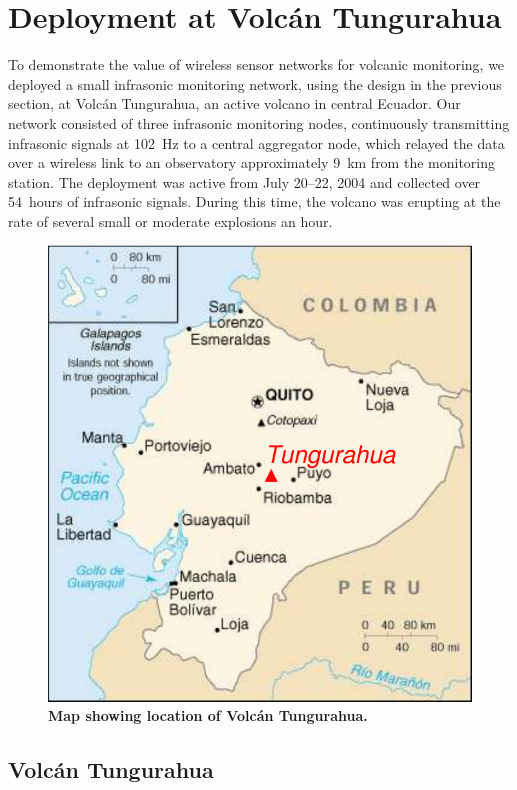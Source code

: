 \section{Deployment at Volc\'{a}n Tungurahua}
\label{sec-deploy}

To demonstrate the value of wireless sensor networks for volcanic
monitoring, we deployed a small infrasonic monitoring network,
using the design in the previous section, at
Volc\'{a}n Tungurahua, an active volcano in central Ecuador.
Our network consisted of three infrasonic monitoring nodes, 
continuously transmitting infrasonic signals at 102~Hz to a central 
aggregator node, which relayed the data over a wireless link to an
observatory approximately 9~km from the monitoring station.
The deployment was active from July 20--22, 2004 and collected over
54~hours of infrasonic signals. During this time, the volcano was
erupting at the rate of several small or moderate explosions an hour.

\begin{figure}[t]
\begin{center}
\includegraphics[width=0.7\hsize]{./figures/tungurahua.pdf}
\end{center}
\caption{\small {\bf Map showing location of Volc\'{a}n Tungurahua.}}
\label{fig-map}
\end{figure}

\subsection{Volc\'{a}n Tungurahua}



